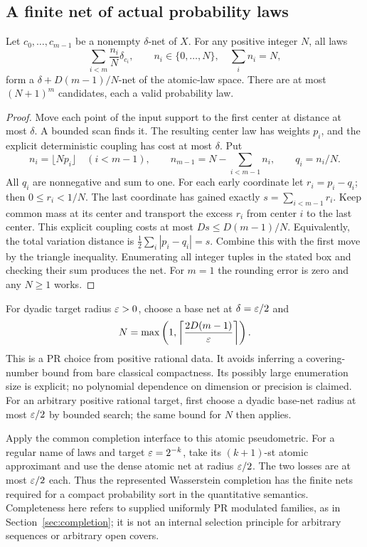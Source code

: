\subsection{A finite net of actual probability laws}

\begin{theorem}\label{thm:probability-net}
Let \(c_0,\ldots,c_{m-1}\) be a nonempty \(\delta\)-net of \(X\).
For any positive integer \(N\), all laws
\[
 \sum_{i<m}\frac{n_i}{N}\delta_{c_i},\qquad
 n_i\in\{0,\ldots,N\},\quad\sum_i n_i=N,
\]
form a \(\delta+D(m-1)/N\)-net of the atomic-law space.
There are at most \((N+1)^m\) candidates, each a valid probability law.
\end{theorem}
\begin{proof}
Move each point of the input support to the first center at distance at
most \(\delta\).  A bounded scan finds it.  The resulting center law
has weights \(p_i\), and the explicit deterministic coupling has cost at
most \(\delta\).  Put
\[
 n_i=\lfloor Np_i\rfloor\quad(i<m-1),\qquad
 n_{m-1}=N-\sum_{i<m-1}n_i,\qquad q_i=n_i/N.
\]
All \(q_i\) are nonnegative and sum to one.  For each early coordinate
let \(r_i=p_i-q_i\); then \(0\leq r_i<1/N\).  The last coordinate
has gained exactly \(s=\sum_{i<m-1}r_i\).  Keep common mass at its
center and transport the excess \(r_i\) from center \(i\) to the last
center.  This explicit coupling costs at most
\(Ds\leq D(m-1)/N\).  Equivalently, the total variation distance is
\(\frac12\sum_i|p_i-q_i|=s\).  Combine this with the first move by
the triangle inequality.  Enumerating all integer tuples in the stated
box and checking their sum produces the net.  For \(m=1\) the rounding
error is zero and any \(N\geq1\) works.
\end{proof}

For dyadic target radius \(\varepsilon>0\), choose a base net at
\(\delta=\varepsilon/2\) and
\[
 N=\max\left(1,\left\lceil\frac{2D(m-1)}{\varepsilon}\right\rceil\right).
\]
This is a PR choice from positive rational data.  It avoids inferring a
covering-number bound from bare classical compactness.  Its possibly large
enumeration size is explicit; no polynomial dependence on dimension or
precision is claimed.
For an arbitrary positive rational target, first choose a dyadic base-net
radius at most \(\varepsilon/2\) by bounded search; the same bound for \(N\)
then applies.

Apply the common completion interface to this atomic pseudometric.
For a regular name of laws and target \(\varepsilon=2^{-k}\), take its
\((k+1)\)-st atomic approximant and use the dense atomic net at radius
\(\varepsilon/2\).  The two losses are at most \(\varepsilon/2\) each.  Thus the
represented Wasserstein completion has the finite nets required for a
compact probability sort in the quantitative semantics.  Completeness
here refers to supplied uniformly PR modulated families, as in
Section~\ref{sec:completion}; it is not an internal selection principle
for arbitrary sequences or arbitrary open covers.

